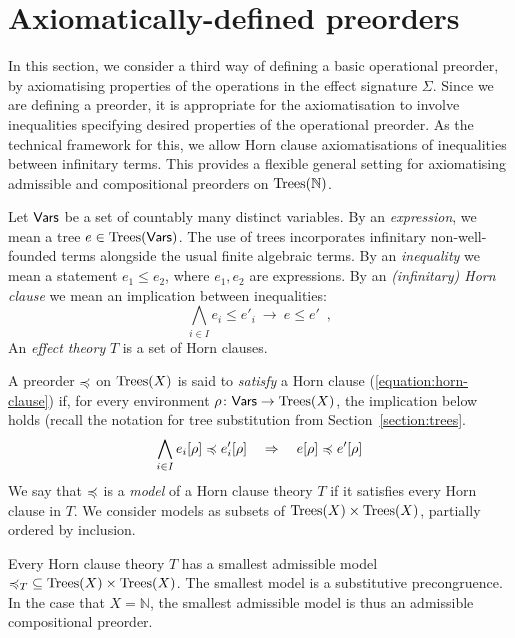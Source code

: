 \section{Axiomatically-defined preorders}

In this section, we consider a third way of defining a basic operational preorder, by axiomatising
properties of the operations in the effect signature $\Sigma$.
Since we are defining a preorder, it is appropriate for the axiomatisation to involve inequalities
specifying desired properties of the operational preorder. As the technical framework for this, we allow
Horn clause axiomatisations of inequalities between infinitary terms.  This provides a flexible general setting for
axiomatising admissible and compositional preorders on 
$\textnormal{Trees}(\mathbb{N})$. 

Let $\mathsf{Vars}$ be a set of countably many distinct variables. By an  \emph{expression}, we mean a
tree $e \in \textnormal{Trees}(\mathsf{Vars})$. The use of trees incorporates infinitary non-well-founded terms alongside the usual finite
algebraic terms. By an \emph{inequality} we mean a statement $e_1 \leq e_2$, where $e_1, e_2$ are expressions.
By an \emph{(infinitary) Horn clause} we mean an implication between inequalities:
\begin{equation}
\label{equation:horn-clause}
\bigwedge_{i \in I} e_i \leq e'_i ~ \rightarrow ~ e \leq e' \enspace ,
\end{equation}
An \emph{effect theory} $T$  is a set of Horn clauses.

A preorder $\preccurlyeq$ on $\textnormal{Trees}(X)$ is said to \emph{satisfy} a Horn clause (\ref{equation:horn-clause}) if,
for every environment $\rho \colon \mathsf{Vars} \to \textnormal{Trees}(X)$, the implication below holds (recall the notation for tree substitution from Section~\ref{section:trees}.
\[
\bigwedge_{i \in I} e_i[\rho] \preccurlyeq e'_i[\rho]~~~ \Rightarrow ~~~ e[\rho] \preccurlyeq e'[\rho] 
\]
We say that $\preccurlyeq$ is a \emph{model} of a Horn clause theory $T$ if it satisfies every Horn clause in $T$.
We consider models as subsets of $\textnormal{Trees}(X) \times \textnormal{Trees}(X)$, partially ordered by inclusion.
\begin{aproposition}
Every Horn clause theory $T$ has a smallest admissible model ${\preccurlyeq_T} \subseteq \textnormal{Trees}(X) \times \textnormal{Trees}(X)$. The smallest model
is a substitutive precongruence. In the case that $X = \mathbb{N}$, the smallest admissible model is thus an
admissible compositional preorder.
\end{aproposition}